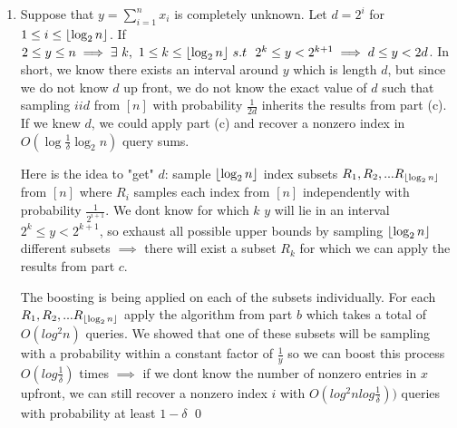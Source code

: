 \documentclass[12pt]{article}
\DeclarePairedDelimiter\floor{\lfloor}{\rfloor}
\begin{document}
\begin{solution}
\begin{enumerate}[label=(\alph*)]
\[
\implies \Pr{Q_i \neq 1} \leq 1 -\frac{1}{4d}
\]
The same analysis from the previous question now holds. We get a larger constant value on $d$ but it still requires $O(\log{\frac{1}{\delta}}\log_{2}{n})$ query sums to find a nonzero index with probability $\geq 1-\delta$. Qualitatively, if we can construct an estimate for $y$ within an interval $d \leq y \leq 2d$ we can find a non negative index in $x$ w.h.p \qed

\item Suppose that $y = \sum_{i=1}^n{x_i}$ is completely unknown. Let $d=2^i$ for $1 \leq i \leq \floor*{\log_{2}{n}}$. If $2 \leq y \leq n \implies \exists~k, ~1\leq k \leq \floor*{\log_{2}{n}} ~s.t~ ~ 2^k \leq y < 2^{k+1} \implies d \leq y < 2d$. In short, we know there exists an interval around $y$ which is length $d$, but since we do not know $d$ up front, we do not know the exact value of $d$ such that sampling $iid$ from $[n]$ with probability $\frac{1}{2d}$ inherits the results from part (c). If we knew $d$, we could apply part (c) and recover a nonzero index in $O(\log{\frac{1}{\delta}}\log_{2}{n})$ query sums.

Here is the idea to "get" $d$: sample  $\floor*{\log_{2}{n}}$ index subsets $R_1, R_2, ... R_{\floor*{\log_{2}{n}}}$ from $[n]$ where $R_i$ samples each index from $[n]$ independently with probability $\frac{1}{2^{i+1}}$. We dont know for which $k$ $y$ will lie in an interval $2^k \leq y < 2^{k+1}$, so exhaust all possible upper bounds by sampling $\floor*{\log_{2}{n}}$ different subsets $\implies $ there will exist a subset $R_k$ for which we can apply the results from part $c$. 

The boosting is being applied on each of the subsets individually. For each $R_1, R_2, ... R_{\floor*{\log_{2}{n}}}$ apply the algorithm from part $b$ which takes a total of $O(log^{2}{n})$ queries. We showed that one of these subsets will be sampling with a probability within a constant factor of $\frac{1}{y}$ so we can boost this process $O(log{\frac{1}{\delta}})$ times $\implies $ if we dont know the number of nonzero entries in $x$ upfront, we can still recover a nonzero index $i$ with $O(log^{2}{n}log{\frac{1}{\delta}}))$ queries with probability at least $1-\delta$ \qed

\end{enumerate}
\end{solution}
\end{document}
